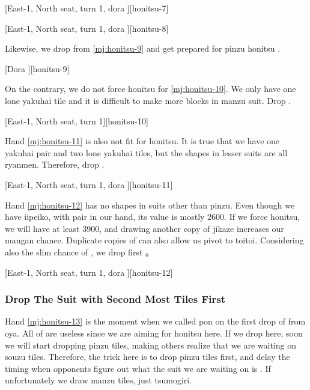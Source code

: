 \documentclass[12pt]{article}
\begin{document}
[East-1, North seat, turn 1, dora ][honitsu-7]

[East-1, North seat, turn 1, dora ][honitsu-8]

Likewise, we drop  from \ref{mj:honitsu-9} and get prepared for pinzu honitsu \citep{hirasawa-honitsu}.

[Dora ][honitsu-9]

On the contrary, we do not force honitsu for \ref{mj:honitsu-10}. We only have one lone yakuhai tile and it is difficult to make more blocks in manzu suit. Drop  \citep[][p.~98]{zero-teyaku}.

[East-1, North seat, turn 1][honitsu-10]

Hand \ref{mj:honitsu-11} is also not fit for honitsu. It is true that we have one yakuhai pair and two lone yakuhai tiles, but the shapes in lesser suits are all ryanmen. Therefore, drop  \citep[][p.~98]{zero-teyaku}.

[East-1, North seat, turn 1, dora ][honitsu-11]

Hand \ref{mj:honitsu-12} has no shapes in suits other than pinzu. Even though we have iipeiko, with  pair in our hand, its value is mostly 2600. If we force honitsu, we will have at least 3900, and drawing another copy of jikaze  increases our mangan chance. Duplicate copies of  can also allow us pivot to toitoi. Considering also the slim chance of , we drop  first \citep[][pp.~104--109]{tetsusenryaku}。

[East-1, North seat, turn 1, dora ][honitsu-12]


\subsubsection*{Drop The Suit with Second Most Tiles First}

Hand \ref{mj:honitsu-13} is the moment when we called pon on the first drop of  from oya. All of  are useless since we are aiming for honitsu here. If we drop  here, soon we will start dropping pinzu tiles, making others realize that we are waiting on souzu tiles. Therefore, the trick here is to drop pinzu tiles first, and delay the timing when opponents figure out what the suit we are waiting on is \citep[][pp.~118--119]{suzuki}. If unfortunately we draw manzu tiles, just tsumogiri.
\end{document}
